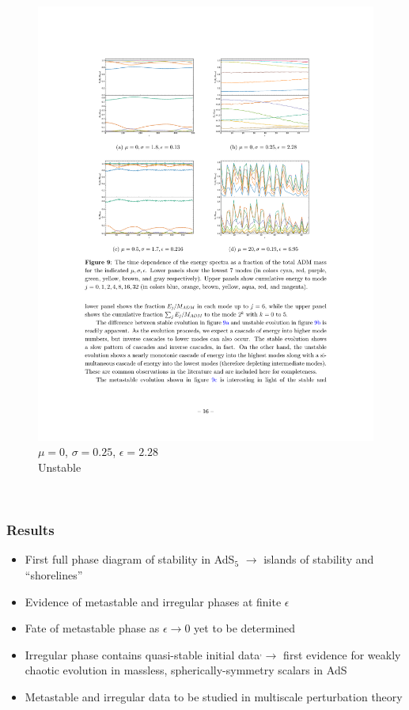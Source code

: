 \documentclass[mathserif,10pt]{beamer}
\newcommand{\bi}{\begin{itemize}}
\newcommand{\ei}{\end{itemize}}
\newcommand{\its}{\item}
\begin{document}
{{\begin{columns}
\begin{figure}
      \includegraphics[width=\textwidth]{Em0w025} \\ $\mu = 0$, $\sigma = 0.25$, $\epsilon=2.28$ \\ Unstable
      \end{figure}
  \end{columns}
}

\subsection*{}  
\frame
{
  \frametitle{Results}
  \bi
  \its First full phase diagram of stability in AdS$_5$ $\to$ islands of stability and ``shorelines''
  \its Evidence of metastable and irregular phases at finite $\epsilon$
  \its Fate of metastable phase as $\epsilon \to 0$ yet to be determined
  \its Irregular phase contains quasi-stable initial data\footnotemark$^{,}$\footnotemark $\to$ first evidence for weakly chaotic evolution in massless, spherically-symmetry scalars in AdS
  \its Metastable and irregular data to be studied in multiscale perturbation theory
  \ei
  
}}
\end{document}
